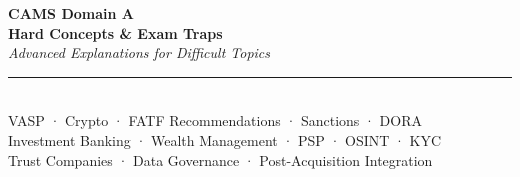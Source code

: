 \documentclass[12pt,aspectratio=169]{beamer}
\begin{document}
	
	\begin{frame}
		\centering
		\vspace{0.5cm}
		{\fontsize{18}{22}\selectfont \textbf{CAMS Domain A}}\\[0.15cm]
		{\fontsize{14}{17}\selectfont \textbf{Hard Concepts \& Exam Traps}}\\[0.2cm]
		{\fontsize{9}{11}\selectfont \textit{Advanced Explanations for Difficult Topics}}\\[0.1cm]
		\rule{4cm}{0.5pt}\\[0.1cm]
		{\fontsize{7}{9}\selectfont VASP · Crypto · FATF Recommendations · Sanctions · DORA}\\[0.05cm]
		{\fontsize{7}{9}\selectfont Investment Banking · Wealth Management · PSP · OSINT · KYC}\\[0.05cm]
		{\fontsize{7}{9}\selectfont Trust Companies · Data Governance · Post-Acquisition Integration}
		\vspace{0.3cm}
	\end{frame}
	
\end{document}
